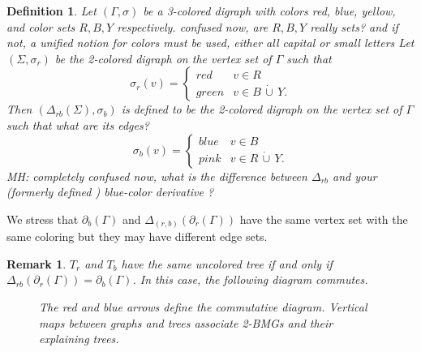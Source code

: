 \documentclass[final,3p,times]{elsarticle}
\newtheorem{definition}{Definition}[section]
\newtheorem{remark}[theorem]{Remark}%
\newcommand{\TODO}[1]{\begingroup\color{red}#1\endgroup}
\newcommand{\OLD}[1]{\begingroup\tiny\color{gray}#1\endgroup}
\begin{document}
\OLD{
\begin{definition}

Let $(\Gamma,\sigma)$ be a 3-colored digraph with colors red, blue, yellow, and color sets $R,B,Y$ respectively.
\TODO{confused now, are $R,B,Y$ really sets? and if not, a unified notion for colors must be used, either all
capital or small letters }
Let $(\Sigma,\sigma_r)$ be the 2-colored digraph on the vertex set of $\Gamma$ such that
\begin{equation}\label{def:sigma-r}
\sigma_r(v)= \begin{cases} 
      red & v\in R \\
     green & v\in B \,\dot{\cup}\, Y.
   \end{cases}
\end{equation}
Then
$(\Delta_{rb}(\Sigma),\sigma_b)$ is defined to be the 2-colored digraph on the vertex set of $\Gamma$ such that
\TODO{what are its edges?}
\begin{equation}\label{def:sigma-b}
\sigma_b(v)= \begin{cases} 
    blue & v\in B \\
     pink & v\in R \,\dot{\cup}\, Y.
   \end{cases}
\end{equation} \TODO{MH: completely confused now, what is the difference between 
$\Delta_{rb}$ and your (formerly defined ) blue-color derivative ?  }
 \end{definition}
 }
 
We stress that $\partial_b(\Gamma)$ and $\Delta_{(r,b)}(\partial_r(\Gamma))$ have the same vertex set with the same coloring but they may have different edge sets. 

\begin{remark}
\label{obs:delta_operator}
$T_r$ and $T_b$ have the same uncolored tree if and only if $\Delta_{rb}(\partial_r(\Gamma))=\partial_b(\Gamma)$. In this case, the following diagram commutes.
\begin{figure}[ht]
  \centering
{}
\caption{The red and blue arrows define the commutative diagram. Vertical maps between graphs and trees associate 2-BMGs and their explaining trees.}
\label{fig:diagram}
\end{figure}
\end{remark}
\end{document}
